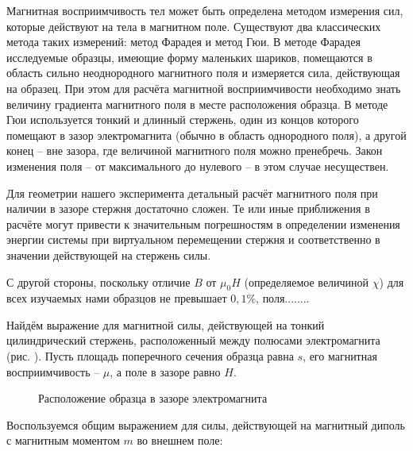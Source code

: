 
Магнитная восприимчивость тел может быть определена методом измерения сил, которые действуют на тела в магнитном поле. Существуют два классических метода таких измерений: метод Фарадея и метод Гюи. В методе Фарадея исследуемые образцы, имеющие форму маленьких шариков, помещаются в область сильно неоднородного магнитного поля и измеряется сила, действующая на образец. При этом для расчёта магнитной восприимчивости необходимо знать величину градиента магнитного поля в месте расположения образца. В методе Гюи используется тонкий и длинный стержень, один из концов которого помещают в зазор электромагнита (обычно в область однородного поля), а другой конец -- вне зазора, где величиной магнитного поля можно пренебречь. Закон изменения поля -- от максимального до нулевого -- в этом случае несуществен.

Для геометрии нашего эксперимента детальный расчёт магнитного поля при наличии в зазоре стержня достаточно сложен. Те или иные приближения в расчёте могут привести к значительным погрешностям в определении изменения энергии системы при виртуальном перемещении стержня и соответственно в значении действующей на стержень силы.

С другой стороны, поскольку отличие $B$ от $\mu_0 H$ (определяемое величиной $\chi$) для всех изучаемых нами образцов не превышает $0,1\%$, поля........


Найдём выражение для магнитной силы, действующей на тонкий цилиндрический стержень, расположенный между полюсами электромагнита (рис. ). Пусть площадь поперечного сечения образца равна $s$, его магнитная восприимчивость -- $\mu$, а поле в зазоре равно $H$.


\begin{wrapfigure}{r}{0.4\textwidth}
	\caption{Расположение образца в зазоре электромагнита}
\end{wrapfigure}

Воспользуемся общим выражением для силы, действующей на магнитный диполь с магнитным моментом $m$ во внешнем поле:

